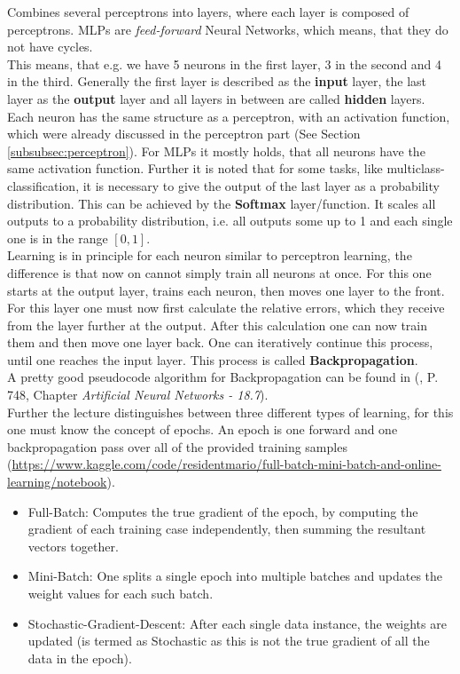 \documentclass[12pt,a4paper]{article}
\begin{document}
\noindent Combines several perceptrons into layers, where each layer is composed of perceptrons. MLPs are \textit{feed-forward} Neural Networks, which means, that they do not have cycles.\\
This means, that e.g. we have 5 neurons in the first layer, 3 in the second and 4 in the third. Generally the first layer is described as the \textbf{input} layer, the last layer as the \textbf{output} layer and all layers in between are called \textbf{hidden} layers.\\
Each neuron has the same structure as a perceptron, with an activation function, which were already discussed in the perceptron part (See Section \ref{subsubsec:perceptron}). For MLPs it mostly holds, that all neurons have the same activation function. Further it is noted that for some tasks, like multiclass-classification, it is necessary to give the output of the last layer as a probability distribution. This can be achieved by the \textbf{Softmax} layer/function. It scales all outputs to a probability distribution, i.e. all outputs some up to 1 and each single one is in the range \([0,1]\).\\[1em]
Learning is in principle for each neuron similar to perceptron learning, the difference is that now on cannot simply train all neurons at once. For this one starts at the output layer, trains each neuron, then moves one layer to the front. For this layer one must now first calculate the relative errors, which they receive from the layer further at the output. After this calculation one can now train them and then move one layer back. One can iteratively continue this process, until one reaches the input layer. This process is called \textbf{Backpropagation}.\\
A pretty good pseudocode algorithm for Backpropagation can be found in (\cite{aima}, P. 748, Chapter \textit{Artificial Neural Networks - 18.7}).\\[1em]
Further the lecture distinguishes between three different types of learning, for this one must know the concept of epochs. An epoch is one forward and one backpropagation pass over all of the provided training samples (\url{https://www.kaggle.com/code/residentmario/full-batch-mini-batch-and-online-learning/notebook}).\\

\begin{itemize}
    \item Full-Batch: Computes the true gradient of the epoch, by computing the gradient of each training case independently, then summing the resultant vectors together.
    \item Mini-Batch: One splits a single epoch into multiple batches and updates the weight values for each such batch.
    \item Stochastic-Gradient-Descent: After each single data instance, the weights are updated (is termed as Stochastic as this is not the true gradient of all the data in the epoch).
\end{itemize}
\end{document}
